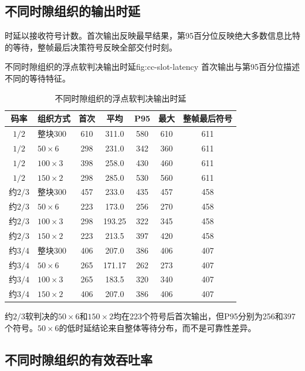 \subsection{不同时隙组织的输出时延}

时延以接收符号计数。首次输出反映最早结果，第95百分位反映绝大多数信息比特的等待，整帧最后决策符号反映全部交付时刻。

  {不同时隙组织的浮点软判决输出时延}{fig:cc-slot-latency}
  {首次输出与第95百分位描述不同的等待特征。}

\begin{table}[htbp]
  \centering
  \scriptsize
  \caption{不同时隙组织的浮点软判决输出时延}
  \label{tab:cc-slot-latency}
  \begin{tabular}{c p{}c c c c c}
    \toprule
    码率 & 组织方式 & 首次 & 平均 & P95 & 最大 & 整帧最后符号 \\
    \midrule
    $1/2$ & 整块300 & 610 & 311.0 & 580 & 610 & 611 \\
    $1/2$ & $50\times6$ & 298 & 231.0 & 342 & 360 & 611 \\
    $1/2$ & $100\times3$ & 398 & 258.0 & 430 & 460 & 611 \\
    $1/2$ & $150\times2$ & 298 & 285.0 & 530 & 560 & 611 \\
    \midrule
    约$2/3$ & 整块300 & 457 & 233.0 & 435 & 457 & 458 \\
    约$2/3$ & $50\times6$ & 223 & 173.0 & 256 & 270 & 458 \\
    约$2/3$ & $100\times3$ & 298 & 193.25 & 322 & 345 & 458 \\
    约$2/3$ & $150\times2$ & 223 & 213.5 & 397 & 420 & 458 \\
    \midrule
    约$3/4$ & 整块300 & 406 & 207.0 & 386 & 406 & 407 \\
    约$3/4$ & $50\times6$ & 265 & 171.17 & 262 & 273 & 407 \\
    约$3/4$ & $100\times3$ & 265 & 183.5 & 320 & 340 & 407 \\
    约$3/4$ & $150\times2$ & 406 & 207.0 & 386 & 406 & 407 \\
    \bottomrule
  \end{tabular}
\end{table}

约$2/3$软判决的$50\times6$和$150\times2$均在223个符号后首次输出，但P95分别为256和397个符号。$50\times6$的低时延结论来自整体等待分布，而不是可靠性差异。

\subsection{不同时隙组织的有效吞吐率}

